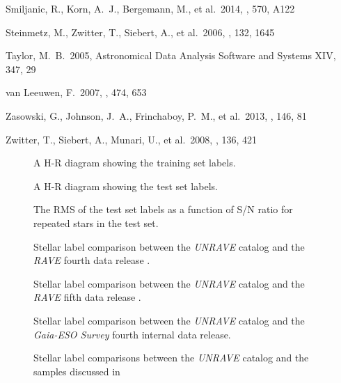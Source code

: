 \documentclass[preprint,trackchanges]{aastex}
\newcommand{\project}[1]{\textsl{#1}}
\begin{document}
\begin{thebibliography}{dummy}
 Smiljanic, R., Korn, A.~J., Bergemann, M., et al.\ 2014, \aap, 570, A122 

 Steinmetz, M., Zwitter, T., Siebert, A., et al.\ 2006, \aj, 132, 1645 

 Taylor, M.~B.\ 2005, Astronomical Data Analysis Software and Systems XIV, 347, 29 

 van Leeuwen, F.\ 2007, \aap, 474, 653 

 Zasowski, G., Johnson, J.~A., Frinchaboy, P.~M., et al.\ 2013, \aj, 146, 81 

 Zwitter, T., Siebert, A., Munari, U., et al.\ 2008, \aj, 136, 421 

\end{thebibliography}

\clearpage

\begin{figure}[p]
\caption{A H-R diagram showing the training set labels.\label{fig:training-set-hrd}}
\end{figure}

\begin{figure}[p]
\caption{A H-R diagram showing the test set labels.\label{fig:test-set-hrd}}
\end{figure}

\begin{figure*}[p]
\caption{The RMS of the test set labels as a function of S/N ratio for repeated stars in the test set.\label{fig:test-set-repeats}}
\end{figure*}

\begin{figure*}[p]
\caption{Stellar label comparison between the \project{UNRAVE} catalog and the \project{RAVE} fourth data release \citep{Kordopatis_2014}.\label{fig:rave-dr4-comparison}}
\end{figure*}


\begin{figure*}[p]
\caption{Stellar label comparison between the \project{UNRAVE} catalog and the \project{RAVE} fifth data release \citep{Kunder_2016}.\label{fig:rave-dr5-comparison}}
\end{figure*}

\begin{figure*}[p]
\caption{Stellar label comparison between the \project{UNRAVE} catalog and the \project{Gaia-ESO Survey} fourth internal data release.\label{fig:ges-dr4-comparison}}
\end{figure*}

\begin{figure*}[p]
\caption{Stellar label comparisons between the \project{UNRAVE} catalog and the samples discussed in \citep{Kordopatis_2014}}
\end{figure*}
\end{document}
